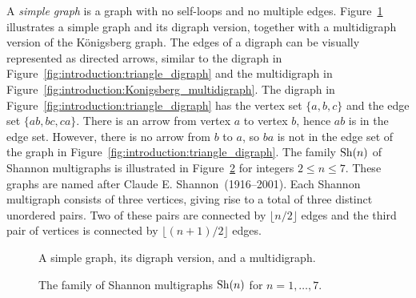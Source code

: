 A \emph{simple graph} is a graph with no self-loops and no multiple
edges. Figure~\ref{fig:introduction:simple_graph_digraph_multidigraph}
illustrates a simple graph and its digraph version, together with a
multidigraph version of the K\"onigsberg graph. The edges of a digraph
can be visually represented as directed arrows, similar to the digraph
in
Figure~\ref{fig:introduction:triangle_digraph} and the multidigraph in
Figure~\ref{fig:introduction:Konigsberg_multidigraph}. The digraph in
Figure~\ref{fig:introduction:triangle_digraph} has the vertex set
$\{a, b, c\}$ and the edge set $\{ab, bc, ca\}$. There is an arrow
from vertex $a$ to vertex $b$, hence $ab$ is in the edge set. However,
there is no arrow from $b$ to $a$, so $ba$ is not in the edge set of
the graph in Figure~\ref{fig:introduction:triangle_digraph}. The
family $\operatorname*{Sh}(n)$ of Shannon multigraphs is illustrated in
Figure~\ref{fig:introduction:Shannon_multigraphs} for integers
$2 \leq n \leq 7$. These graphs are named after Claude
E. Shannon~(1916--2001). Each Shannon multigraph consists of three
vertices, giving rise to a total of three distinct unordered
pairs. Two of these pairs are connected by $\lfloor n/2 \rfloor$
edges and the third pair of vertices is connected by
$\lfloor (n + 1) / 2 \rfloor$ edges.

\begin{figure}[!htbp]
\centering

\caption{A simple graph, its digraph version, and a multidigraph.}
\label{fig:introduction:simple_graph_digraph_multidigraph}
\end{figure}

\begin{figure}[!htbp]
\centering

\caption{The family of Shannon multigraphs $\operatorname*{Sh}(n)$ for $n = 1,\dots,7$.}
\label{fig:introduction:Shannon_multigraphs}
\end{figure}

